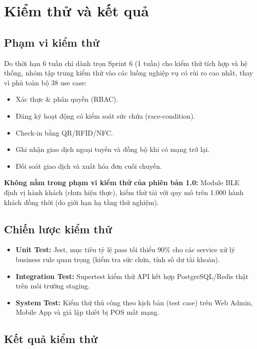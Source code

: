 \section{Kiểm thử và kết quả}

\subsection{Phạm vi kiểm thử}
Do thời hạn 6 tuần chỉ dành trọn Sprint 6 (1 tuần) cho kiểm thử tích hợp
và hệ thống, nhóm tập trung kiểm thử vào các luồng nghiệp vụ có rủi ro
cao nhất, thay vì phủ toàn bộ 38 use case:
\begin{itemize}
    \item Xác thực \& phân quyền (RBAC).
    \item Đăng ký hoạt động có kiểm soát sức chứa (race-condition).
    \item Check-in bằng QR/RFID/NFC.
    \item Ghi nhận giao dịch ngoại tuyến và đồng bộ khi có mạng trở lại.
    \item Đối soát giao dịch và xuất hóa đơn cuối chuyến.
\end{itemize}

\textbf{Không nằm trong phạm vi kiểm thử của phiên bản 1.0:} Module BLE
định vị hành khách (chưa hiện thực), kiểm thử tải với quy mô trên 1.000
hành khách đồng thời (do giới hạn hạ tầng thử nghiệm).

\subsection{Chiến lược kiểm thử}
\begin{itemize}
    \item \textbf{Unit Test:} Jest, mục tiêu tỷ lệ pass tối thiểu 90\%
    cho các service xử lý business rule quan trọng (kiểm tra sức chứa,
    tính số dư tài khoản).
    \item \textbf{Integration Test:} Supertest kiểm thử API kết hợp
    PostgreSQL/Redis thật trên môi trường staging.
    \item \textbf{System Test:} Kiểm thử thủ công theo kịch bản
    (test case) trên Web Admin, Mobile App và giả lập thiết bị POS mất
    mạng.
\end{itemize}

\subsection{Kết quả kiểm thử}


